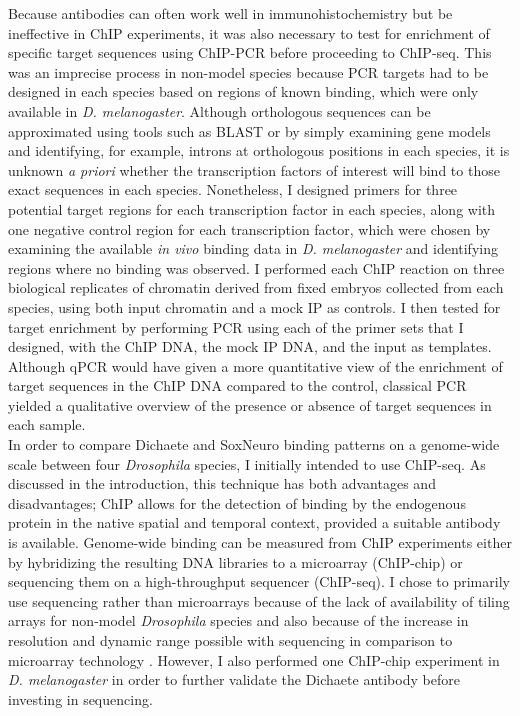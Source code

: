 Because antibodies can often work well in immunohistochemistry but be ineffective in ChIP experiments, it was also necessary to test for enrichment of specific target sequences using ChIP-PCR before proceeding to ChIP-seq. This was an imprecise process in non-model species because PCR targets had to be designed in each species based on regions of known binding, which were only available in \emph{D. melanogaster}. Although orthologous sequences can be approximated using tools such as BLAST \citep{altschul_basic_1990} or by simply examining gene models and identifying, for example, introns at orthologous positions in each species, it is unknown \emph{a priori} whether the transcription factors of interest will bind to those exact sequences in each species. Nonetheless, I designed primers for three potential target regions for each transcription factor in each species, along with one negative control region for each transcription factor, which were chosen by examining the available \emph{in vivo} binding data in \emph{D. melanogaster} and identifying regions where no binding was observed. I performed each ChIP reaction on three biological replicates of chromatin derived from fixed embryos collected from each species, using both input chromatin and a mock IP as controls. I then tested for target enrichment by performing PCR using each of the primer sets that I designed, with the ChIP DNA, the mock IP DNA, and the input as templates. Although qPCR would have given a more quantitative view of the enrichment of target sequences in the ChIP DNA compared to the control, classical PCR yielded a qualitative overview of the presence or absence of target sequences in each sample.\\

In order to compare Dichaete and SoxNeuro binding patterns on a genome-wide scale between four \emph{Drosophila} species, I initially intended to use ChIP-seq. As discussed in the introduction, this technique has both advantages and disadvantages; ChIP allows for the detection of binding by the endogenous protein in the native spatial and temporal context, provided a suitable antibody is available. Genome-wide binding can be measured from ChIP experiments either by hybridizing the resulting DNA libraries to a microarray (ChIP-chip) or sequencing them on a high-throughput sequencer (ChIP-seq). I chose to primarily use sequencing rather than microarrays because of the lack of availability of tiling arrays for non-model \emph{Drosophila} species and also because of the increase in resolution and dynamic range possible with sequencing in comparison to microarray technology \citep{aleksic_chiping_2009}. However, I also performed one ChIP-chip experiment in \emph{D. melanogaster} in order to further validate the Dichaete antibody before investing in sequencing.\\

